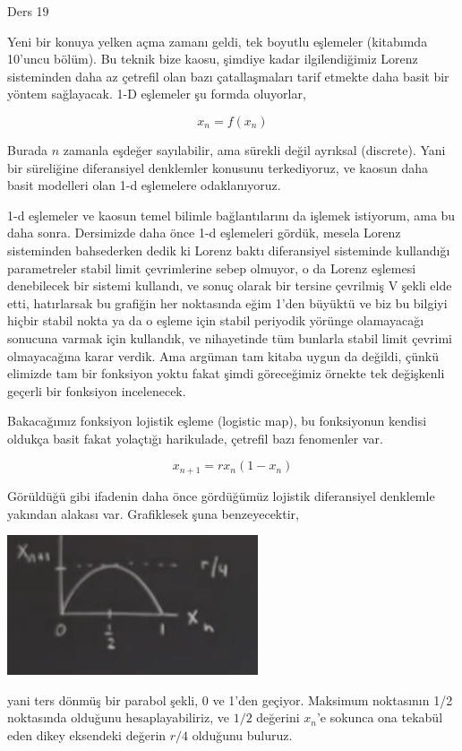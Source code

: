 \documentclass[12pt,fleqn]{article}\usepackage{../../common}
\begin{document}
Ders 19

Yeni bir konuya yelken açma zamanı geldi, tek boyutlu eşlemeler
(kitabımda 10'uncu bölüm). Bu teknik bize kaosu, şimdiye kadar ilgilendiğimiz
Lorenz sisteminden daha az çetrefil olan bazı çatallaşmaları tarif etmekte daha
basit bir yöntem sağlayacak. 1-D eşlemeler şu formda oluyorlar,

$$ x_n = f(x_n) $$

Burada $n$ zamanla eşdeğer sayılabilir, ama sürekli değil ayrıksal
(discrete). Yani bir süreliğine diferansiyel denklemler konusunu
terkediyoruz, ve kaosun daha basit modelleri olan 1-d eşlemelere
odaklanıyoruz. 

1-d eşlemeler ve kaosun temel bilimle bağlantılarını da işlemek istiyorum,
ama bu daha sonra. Dersimizde daha önce 1-d eşlemeleri gördük, mesela
Lorenz sisteminden bahsederken dedik ki Lorenz baktı diferansiyel
sisteminde kullandığı parametreler stabil limit çevrimlerine sebep olmuyor,
o da Lorenz eşlemesi denebilecek bir sistemi kullandı, ve sonuç olarak bir
tersine çevrilmiş V şekli elde etti, hatırlarsak bu grafiğin her noktasında
eğim 1'den büyüktü ve biz bu bilgiyi hiçbir stabil nokta ya da o eşleme
için stabil periyodik yörünge olamayacağı sonucuna varmak için kullandık,
ve nihayetinde tüm bunlarla stabil limit çevrimi olmayacağına karar
verdik. Ama argüman tam kitaba uygun da değildi, çünkü elimizde tam bir
fonksiyon yoktu fakat şimdi göreceğimiz örnekte tek değişkenli geçerli bir
fonksiyon incelenecek.

Bakacağımız fonksiyon lojistik eşleme (logistic map), bu fonksiyonun
kendisi oldukça basit fakat yolaçtığı harikulade, çetrefil bazı fenomenler
var.

$$ x_{n+1} = r x_n (1-x_n) $$

Görüldüğü gibi ifadenin daha önce gördüğümüz lojistik diferansiyel
denklemle yakından alakası var. Grafiklesek şuna benzeyecektir,

\includegraphics[width=20em]{19_01.png}

yani ters dönmüş bir parabol şekli, 0 ve 1'den geçiyor. Maksimum noktasının
1/2 noktasında olduğunu hesaplayabiliriz, ve $1/2$ değerini $x_n$'e sokunca
ona tekabül eden dikey eksendeki değerin $r/4$ olduğunu buluruz. 
\end{document}
